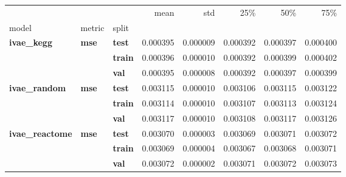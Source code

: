 \begin{tabular}{lllrrrrr}
\toprule
 &  &  & mean & std & 25\% & 50\% & 75\% \\
model & metric & split &  &  &  &  &  \\
\midrule
\multirow[t]{3}{*}{\textbf{ivae\_kegg}} & \multirow[t]{3}{*}{\textbf{mse}} & \textbf{test} & 0.000395 & 0.000009 & 0.000392 & 0.000397 & 0.000400 \\
\textbf{} & \textbf{} & \textbf{train} & 0.000396 & 0.000010 & 0.000392 & 0.000399 & 0.000402 \\
\textbf{} & \textbf{} & \textbf{val} & 0.000395 & 0.000008 & 0.000392 & 0.000397 & 0.000399 \\
\cline{1-8} \cline{2-8}
\multirow[t]{3}{*}{\textbf{ivae\_random}} & \multirow[t]{3}{*}{\textbf{mse}} & \textbf{test} & 0.003115 & 0.000010 & 0.003106 & 0.003115 & 0.003122 \\
\textbf{} & \textbf{} & \textbf{train} & 0.003114 & 0.000010 & 0.003107 & 0.003113 & 0.003124 \\
\textbf{} & \textbf{} & \textbf{val} & 0.003117 & 0.000010 & 0.003108 & 0.003117 & 0.003126 \\
\cline{1-8} \cline{2-8}
\multirow[t]{3}{*}{\textbf{ivae\_reactome}} & \multirow[t]{3}{*}{\textbf{mse}} & \textbf{test} & 0.003070 & 0.000003 & 0.003069 & 0.003071 & 0.003072 \\
\textbf{} & \textbf{} & \textbf{train} & 0.003069 & 0.000004 & 0.003067 & 0.003068 & 0.003071 \\
\textbf{} & \textbf{} & \textbf{val} & 0.003072 & 0.000002 & 0.003071 & 0.003072 & 0.003073 \\
\cline{1-8} \cline{2-8}
\bottomrule
\end{tabular}
